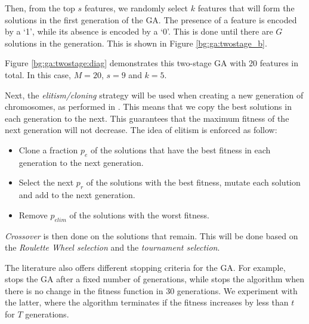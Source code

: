 \documentclass[12pt, twoside, a4paper]{report}
\begin{document}
Then, from the top $s$ features, we randomly select $k$ features that will form the solutions in the first generation of the GA. The presence of a feature is encoded by a `1', while its absence is encoded by a `0'. This is done until there are $G$ solutions in the generation. This is shown in Figure \ref{bg:ga:twostage_b}.


Figure \ref{bg:ga:twostage:diag} demonstrates this two-stage GA with 20 features in total. In this case, $M=20$, $s=9$ and $k=5$.

Next, the \textit{elitism/cloning} strategy will be used when creating a new generation of chromosomes, as performed in \cite{RefWorks:212}. This means that we copy the best solutions in each generation to the next. This guarantees that the maximum fitness of the next generation will not decrease. The idea of elitism is enforced as follow:
\begin{itemize}
  \item Clone a fraction $p_e$ of the solutions that have the best fitness in each generation to the next generation.
  \item Select the next $p_r$ of the solutions with the best fitness, mutate each solution and add to the next generation.
  \item Remove $p_{elim}$ of the solutions with the worst fitness.
\end{itemize}

\textit{Crossover} is then done on the solutions that remain. This will be done based on the \textit{Roulette Wheel selection} and the \textit{tournament selection}.


The literature also offers different stopping criteria for the GA. For example, \cite{RefWorks:202} stops the GA after a fixed number of generations, while \cite{RefWorks:212} stops the algorithm when there is no change in the fitness function in 30 generations. We experiment with the latter, where the algorithm terminates if the fitness increases by less than $t$ for $T$ generations.
\end{document}
